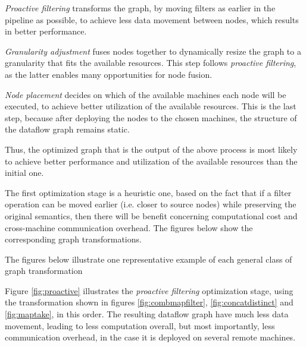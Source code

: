 \documentclass{dithesis}
\begin{document}

\textit{Proactive filtering} transforms the graph, by moving filters as earlier in the pipeline as possible, to achieve less data movement between nodes, which results in better performance.

\textit{Granularity adjustment} fuses nodes together to dynamically resize the graph to a granularity that fits the available resources. This step follows \textit{proactive filtering}, as the latter enables many opportunities for node fusion.

\textit{Node placement} decides on which of the available machines each node will be executed, to achieve better utilization of the available resources. This is the last step, because after deploying the nodes to the chosen machines, the structure of the dataflow graph remains static.

Thus, the optimized graph that is the output of the above process is most likely to achieve better performance and utilization of the available resources than the initial one.


The first optimization stage is a heuristic one, based on the fact that if a filter operation can be moved earlier (i.e. closer to source nodes) while preserving the original semantics, then there will be benefit concerning computational cost and cross-machine communication overhead. The figures below show the corresponding graph transformations.


The figures below illustrate one representative example of each general class of graph transformation


\newpage
{}

Figure \ref{fig:proactive} illustrates the \textit{proactive filtering} optimization stage, using the transformation shown in figures \ref{fig:combmapfilter}, \ref{fig:concatdistinct} and \ref{fig:maptake}, in this order. The resulting dataflow graph have much less data movement, leading to less computation overall, but most importantly, less communication overhead, in the case it is deployed on several remote machines.

\end{document}

